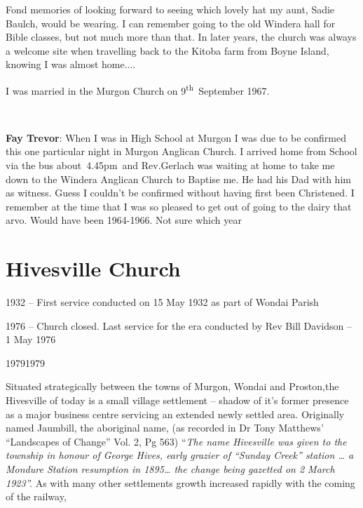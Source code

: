 Fond memories of looking forward to seeing which lovely hat my aunt, Sadie Baulch, would be wearing. I can remember going to the old Windera hall for Bible classes, but not much more than that. In later years, the church was always a welcome site when travelling back to the Kitoba farm from Boyne Island, knowing I was almost home.... ~



I was married in the Murgon Church on 9\textsuperscript{th}~September 1967.



~



\textbf{Fay Trevor}: When I was in High School at Murgon I was due to be confirmed this one particular night in Murgon Anglican Church. I arrived home from School via the bus about~4.45pm~and Rev.Gerlach was waiting at home to take me down to the Windera Anglican Church to Baptise me. He had his Dad with him as witness. Guess I couldn't be confirmed without having first been Christened. I remember at the time that I was so pleased to get out of going to the dairy that arvo. Would have been 1964-1966. Not sure which year



\section{Hivesville Church}



1932 -- First service conducted on 15 May 1932 as part of Wondai Parish



1976 -- Church closed. Last service for the era conducted by Rev Bill Davidson -- 1 May 1976



19791979



Situated strategically between the towns of Murgon, Wondai and Proston,the Hivesville of today is a small village settlement -- shadow of it's former presence as a major business centre servicing an extended newly settled area. Originally named Jaumbill, the aboriginal name, (as recorded in Dr Tony Matthews' ``Landscapes of Change'' Vol. 2, Pg 563) ``\emph{The name Hivesville was given to the township in honour of George Hives, early grazier of ``Sunday Creek'' station \ldots{} a Mondure Station resumption in 1895\ldots{} the change being gazetted on 2 March 1923''.} As with many other settlements growth increased rapidly with the coming of the railway,



